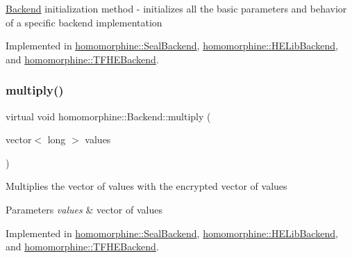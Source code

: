 \mbox{\hyperlink{classhomomorphine_1_1_backend}{Backend}} initialization method -\/ initializes all the basic parameters and behavior of a specific backend implementation 

Implemented in \mbox{\hyperlink{classhomomorphine_1_1_seal_backend_a106556100ae5f2e9dadfa9fc64603d94}{homomorphine\+::\+Seal\+Backend}}, \mbox{\hyperlink{classhomomorphine_1_1_h_e_lib_backend_a6a7e7c8095f2287c41f7d93be91418ec}{homomorphine\+::\+H\+E\+Lib\+Backend}}, and \mbox{\hyperlink{classhomomorphine_1_1_t_f_h_e_backend_ad26df39bd3f3ed8c1ba7b061c2222129}{homomorphine\+::\+T\+F\+H\+E\+Backend}}.

\mbox{\label{classhomomorphine_1_1_backend_a716a0d366daf9a6491ba4d33ebb57d41}} 
\subsubsection{\texorpdfstring{multiply()}{multiply()}\hspace{0.1cm}{\footnotesize\ttfamily [1/2]}}
{\footnotesize\ttfamily virtual void homomorphine\+::\+Backend\+::multiply (\begin{DoxyParamCaption}\item[{vector$<$ long $>$}]{values }\end{DoxyParamCaption})\hspace{0.3cm}{\ttfamily [pure virtual]}}

Multiplies the vector of values with the encrypted vector of values


\begin{DoxyParams}{Parameters}
{\em values} & vector of values \\
\hline
\end{DoxyParams}


Implemented in \mbox{\hyperlink{classhomomorphine_1_1_seal_backend_ace0bb8cd6a0e4b22f6e3e7ab00ea1197}{homomorphine\+::\+Seal\+Backend}}, \mbox{\hyperlink{classhomomorphine_1_1_h_e_lib_backend_a05b508bcc4a165d045ebc09f190c5a95}{homomorphine\+::\+H\+E\+Lib\+Backend}}, and \mbox{\hyperlink{classhomomorphine_1_1_t_f_h_e_backend_a32fbf48183e3a9174bb8ef05f22f0c26}{homomorphine\+::\+T\+F\+H\+E\+Backend}}.

\mbox{\label{classhomomorphine_1_1_backend_a8b09933415165eb84234d9ccfbf2c3c4}} 
